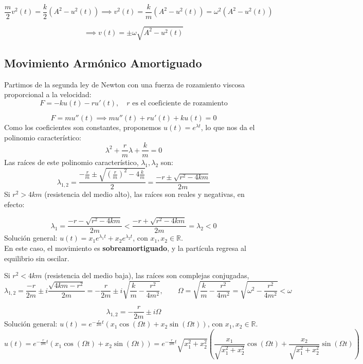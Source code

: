 \[
    \frac{m}{2} v^2(t) = \frac{k}{2} (A^2 - u^2(t)) \implies v^2(t) = \frac{k}{m} \left( A^2 - u^2(t) \right) = \omega^2 (A^2 - u^2(t))
\]

\[
    \implies v(t) = \pm \omega \sqrt{A^2 - u^2(t)}
\]

\subsection{Movimiento Armónico Amortiguado}

Partimos de la segunda ley de Newton con una fuerza de rozamiento viscosa proporcional a la velocidad:
\[
    F = -k u(t) - r u'(t), \quad r \text{ es el coeficiente de rozamiento}
\]

\[
    F = m u''(t) \implies m u''(t) + r u'(t) + k u(t) = 0
\]
Como los coeficientes son constantes, proponemos $u(t) = e^{\lambda t}$, lo que nos da el polinomio característico:
\[
    \lambda^2 + \frac{r}{m} \lambda + \frac{k}{m} = 0   
\]
Las raíces de este polinomio característico, $\lambda_1, \lambda_2$ son:
\[
    \lambda_{1,2} = \frac{-\frac{r}{m} \pm \sqrt{\left(\frac{r}{m}\right)^2 - 4 \frac{k}{m}}}{2} = \frac{-r \pm \sqrt{r^2 - 4km}}{2m}
\]
Si $r^2 > 4km$ (resistencia del medio alto), las raíces son reales y negativas, en efecto:

\[
    \lambda_1 = \frac{-r - \sqrt{r^2 - 4km}}{2m} < \frac{-r+\sqrt{r^2 - 4km}}{2m} = \lambda_2 < 0
\]
Solución general: $u(t) = x_1 e^{\lambda_1 t} + x_2 e^{\lambda_2 t}$, con $x_1, x_2 \in \mathbb{R}$. \\
En este caso, el movimiento es \textbf{sobreamortiguado}, y la partícula regresa al equilibrio sin oscilar.

Si $r^2 < 4km$ (resistencia del medio baja), las raíces son complejas conjugadas,
\[
    \lambda_{1,2} = \frac{-r}{2m} \pm i \frac{\sqrt{4km - r^2}}{2m} = -\frac{r}{2m} \pm i \sqrt{\frac{k}{m} - \frac{r^2}{4m^2}}, \qquad \Omega = \sqrt{\frac{k}{m} - \frac{r^2}{4m^2}} = \sqrt{\omega^2 - \frac{r^2}{4m^2}} < \omega
\]

\[
    \lambda_{1,2} = -\frac{r}{2m} \pm i \Omega
\]
Solución general: $u(t) = e^{-\frac{r}{2m} t} (x_1 \cos(\Omega t) + x_2 \sin(\Omega t))$, con $x_1, x_2 \in \mathbb{R}$. \\

\[
    u(t) = e^{-\frac{r}{2m} t} (x_1 \cos(\Omega t) + x_2 \sin(\Omega t)) = e^{-\frac{r}{2m} t} \sqrt{x_1^2 + x_2^2} \left( \frac{x_1}{\sqrt{x_1^2 + x_2^2}} \cos(\Omega t) + \frac{x_2}{\sqrt{x_1^2 + x_2^2}} \sin(\Omega t) \right)
\]

